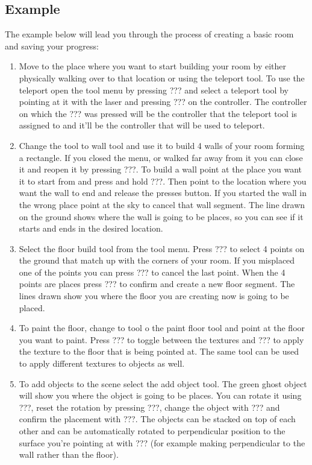 \subsection*{Example}
The example below will lead you through the process of creating a basic room and saving your progress:
\begin{enumerate}
    \item Move to the place where you want to start building your room by either physically walking over to that location or using the teleport tool. To use the teleport open the tool menu by pressing ??? and select a teleport tool by pointing at it with the laser and pressing ??? on the controller. The controller on which the ??? was pressed will be the controller that the teleport tool is assigned to and it'll be the controller that will be used to teleport.
    \item Change the tool to wall tool and use it to build 4 walls of your room forming a rectangle. If you closed the menu, or walked far away from it you can close it and reopen it by pressing ???. To build a wall point at the place you want it to start from and press and hold ???. Then point to the location where you want the wall to end and release the presses button. If you started the wall in the wrong place point at the sky to cancel that wall segment. The line drawn on the ground shows where the wall is going to be places, so you can see if it starts and ends in the desired location.
    \item Select the floor build tool from the tool menu. Press ??? to select 4 points on the ground that match up with the corners of your room. If you misplaced one of the points you can press ??? to cancel the last point. When the 4 points are places press ??? to confirm and create a new floor segment. The lines drawn show you where the floor you are creating now is going to be placed.
    \item To paint the floor, change to tool o the paint floor tool and point at the floor you want to paint. Press ??? to toggle between the textures and ??? to apply the texture to the floor that is being pointed at. The same tool can be used to apply different textures to objects as well.
    \item To add objects to the scene select the add object tool. The green ghost object will show you where the object is going to be places. You can rotate it using ???, reset the rotation by pressing ???, change the object with ??? and confirm the placement with ???. The objects can be stacked on top of each other and can be automatically rotated to perpendicular position to the surface you're pointing at with ??? (for example making perpendicular to the wall rather than the floor).

\end{enumerate}
